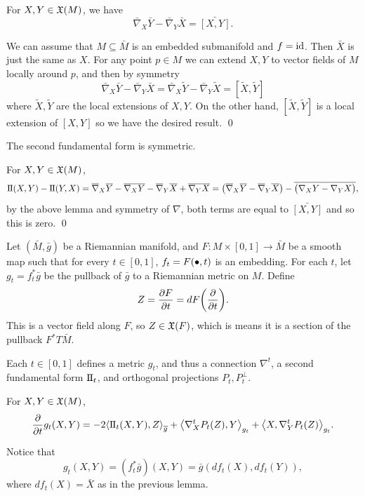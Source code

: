 \blemm

    For $X,Y\in{\frak X}(M)$, we have
    $$ \bar\nabla_X\bar Y - \bar\nabla_Y\bar X = \bar{[X,Y]} . $$

\elemm

\bproof

    We can assume that $M\subseteq\bar M$ is an embedded submanifold and $f={\rm id}$.
    Then $\bar X$ is just the same as $X$.
    For any point $p\in M$ we can extend $X,Y$ to vector fields of $M$ locally around $p$, and then by symmetry
    $$ \bar\nabla_X\bar Y - \bar\nabla_Y\bar X = \bar\nabla_X\tilde Y - \bar\nabla_Y\tilde X = [\tilde X,\tilde Y] $$
    where $\tilde X,\tilde Y$ are the local extensions of $X,Y$.
    On the other hand, $[\tilde X,\tilde Y]$ is a local extension of $[X,Y]$ so we have the desired result.
    \qed

\eproof

\bcoro

    The second fundamental form is symmetric.

\ecoro

\bproof

    For $X,Y\in{\frak X}(M)$,
    $$ {\rm I\mkern-1mu\relax I}(X,Y) - {\rm I\mkern-1mu\relax I}(Y,X) = \overline\nabla_X\overline Y - \overline{\nabla_XY} - \overline\nabla_Y\overline X + \overline{\nabla_YX} =
    \bigl(\overline\nabla_X\overline Y - \overline\nabla_Y\overline X\bigr) - \overline{\bigl(\nabla_XY - \nabla_YX\bigr)} , $$
    by the above lemma and symmetry of $\nabla$, both terms are equal to $\bar{[X,Y]}$ and so this is zero.
    \qed

\eproof

Let $(\bar M,\bar g)$ be a Riemannian manifold, and $F\colon M\times[0,1]\to\bar M$ be a smooth map such that for every $t\in[0,1]$,
$f_t=F(\bullet,t)$ is an embedding.
For each $t$, let $g_t=f_t^*\bar g$ be the pullback of $\bar g$ to a Riemannian metric on $M$.
Define
$$ Z = {{\partial F}\over{\partial t}} = dF\mathopen{}\mathclose{\left({{\partial }\over{\partial t}}\right)} . $$
This is a vector field along $F$, so $Z\in{\frak X}(F)$, which is means it is a section of the pullback $F^*T\bar M$.

Each $t\in[0,1]$ defines a metric $g_t$, and thus a connection $\nabla^t$, a second fundamental form ${\rm I\mkern-1mu\relax I}_t$, and orthogonal projections
$P_t,P^\perp_t$.

\blemm

    For $X,Y\in{\frak X}(M)$,
    $$ {{\partial }\over{\partial t}}g_t(X,Y) = -2\mathopen{}\mathclose{\left<{\rm I\mkern-1mu\relax I}_t(X,Y),Z\right>}_{\overline g} + \mathopen{}\mathclose{\left<\nabla_X^tP_t(Z),Y\right>}_{g_t} + \mathopen{}\mathclose{\left<X,\nabla_Y^tP_t(Z)\right>}_{g_t} . $$

\elemm

\bproof

    Notice that
    $$ g_t(X,Y) = (f_t^*\bar g)(X,Y) = \bar g(df_t(X),df_t(Y)) , $$
    where $df_t(X)=\bar X$ as in the previous lemma.

